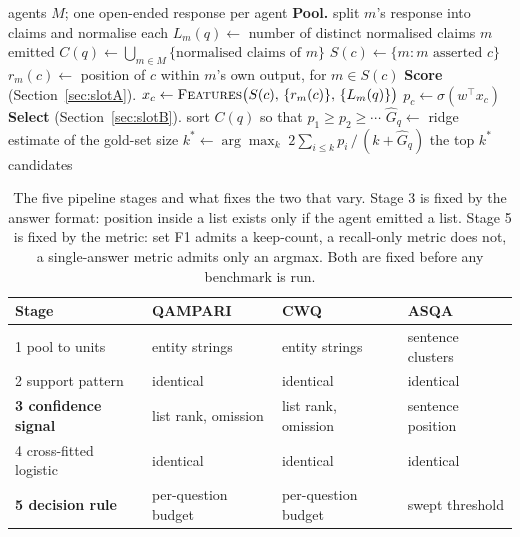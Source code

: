 \documentclass{article}
\begin{document}
\begin{algorithm}[t]
\caption{Behavioural aggregation for one question $q$.}
\label{alg:beh}
\begin{algorithmic}[1]
\Require agents $M$; one open-ended response per agent
\Statex \textbf{Pool.}
  \State split $m$'s response into claims and normalise each
  \State $L_m(q) \gets$ number of distinct normalised claims $m$ emitted
\EndFor
\State $C(q) \gets \bigcup_{m \in M} \{\text{normalised claims of } m\}$
  \State $S(c) \gets \{m : m \text{ asserted } c\}$
  \State $r_m(c) \gets$ position of $c$ within $m$'s own output, for $m \in S(c)$
\EndFor
\Statex \textbf{Score} (Section~\ref{sec:slotA}).
  \State $x_c \gets \textsc{Features}\big(S(c),\, \{r_m(c)\},\, \{L_m(q)\}\big)$
  \State $p_c \gets \sigma(w^\top x_c)$ 
\EndFor
\Statex \textbf{Select} (Section~\ref{sec:slotB}).
\State sort $C(q)$ so that $p_1 \geq p_2 \geq \cdots$
\State $\hat{G}_q \gets$ ridge estimate of the gold-set size
\State $k^{*} \gets \arg\max_{k}\; 2\sum_{i \leq k} p_i \,/\, (k + \hat{G}_q)$
\State \Return the top $k^{*}$ candidates
\end{algorithmic}
\end{algorithm}

\begin{table}[t]
  \caption{The five pipeline stages and what fixes the two that vary. Stage 3 is fixed by the answer format: position inside a list exists only if the agent emitted a list. Stage 5 is fixed by the metric: set F1 admits a keep-count, a recall-only metric does not, a single-answer metric admits only an argmax. Both are fixed before any benchmark is run.}
  \label{tab:slots}
  \centering
  \begin{tabular}{llll}
    \toprule
    Stage & QAMPARI & CWQ & ASQA \\
    \midrule
    1 pool to units       & entity strings   & entity strings & sentence clusters  \\
    2 support pattern     & identical        & identical      & identical          \\
    \textbf{3 confidence signal} & list rank, omission & list rank, omission & sentence position \\
    4 cross-fitted logistic & identical      & identical      & identical          \\
    \textbf{5 decision rule}     & per-question budget & per-question budget & swept threshold \\
    \bottomrule
  \end{tabular}
\end{table}
\end{document}
